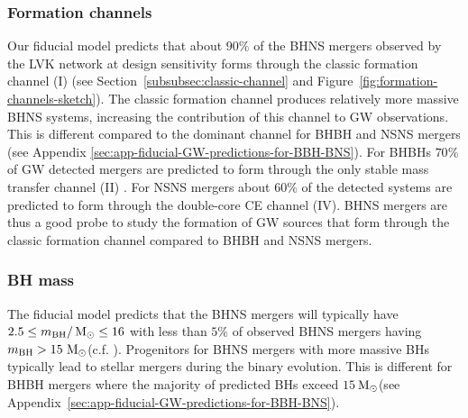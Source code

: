 \documentclass[twocolumn]{aastex63}
\newcommand\bhnsSingle{BHNS\xspace}
\newcommand{\Msun}{\ensuremath{\,\rm{M}_{\odot}}\xspace}
\newcommand{\mbhf}{\ensuremath{m_{\rm{BH}}}\xspace}
\begin{document}
\subsubsection{Formation channels} 
Our fiducial model predicts that about  $90\%$ of the \bhnsSingle mergers  observed by the LVK network at design sensitivity forms through the classic formation channel (I) (see Section~\ref{subsubsec:classic-channel} and Figure~\ref{fig:formation-channels-sketch}). The classic formation channel produces relatively more massive \bhnsSingle systems, increasing the contribution of this channel to \ac{GW} observations. 
This  is different compared to the dominant channel for \ac{BHBH} and \ac{NSNS} mergers (see Appendix \ref{sec:app-fiducial-GW-predictions-for-BBH-BNS}).  For \acp{BHBH} $70\%$ of \ac{GW} detected  mergers are predicted to form through the only stable mass transfer channel (II)  \citep[c.f.][]{2019MNRAS.490.3740N}.  For \ac{NSNS} mergers about $60\%$ of the detected systems are predicted to form through the double-core \ac{CE} channel (IV).   
\bhnsSingle mergers are thus a good probe to study the formation of \ac{GW} sources that form through the classic formation channel compared to \ac{BHBH} and \ac{NSNS} mergers.  


\subsubsection{\ac{BH} mass} 
The fiducial model predicts that the \bhnsSingle mergers  will typically have $2.5 \leq \mbhf/ \Msun \leq 16$ with less than $5\%$ of observed \bhnsSingle mergers having $\mbhf >  15$\Msun (c.f.  \citealt[][]{2020arXiv200302277R}).  Progenitors for \bhnsSingle mergers with more massive \acp{BH}   typically lead to stellar mergers during the binary evolution.  
This is different for  \ac{BHBH} mergers where the majority of predicted \acp{BH} exceed  $15$\Msun (see Appendix~\ref{sec:app-fiducial-GW-predictions-for-BBH-BNS}). 
\end{document}
